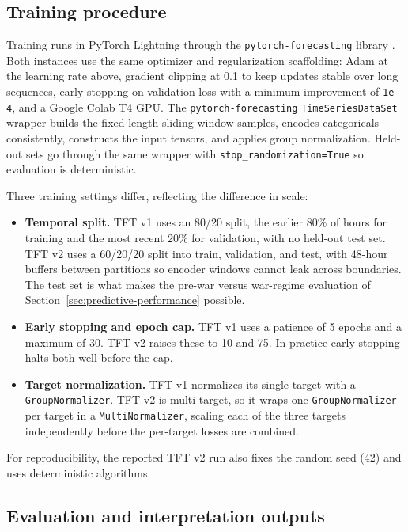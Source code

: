 \subsection{Training procedure}\label{sec:training}

Training runs in PyTorch Lightning \citep{pytorch_lightning} through the \texttt{pytorch-forecasting} library \citep{pytorch_forecasting}. Both instances use the same optimizer and regularization scaffolding: Adam at the learning rate above, gradient clipping at 0.1 to keep updates stable over long sequences, early stopping on validation loss with a minimum improvement of \texttt{1e-4}, and a Google Colab T4 GPU. The \texttt{pytorch-forecasting} \texttt{TimeSeriesDataSet} wrapper builds the fixed-length sliding-window samples, encodes categoricals consistently, constructs the input tensors, and applies group normalization. Held-out sets go through the same wrapper with \texttt{stop\_randomization=True} so evaluation is deterministic.

Three training settings differ, reflecting the difference in scale:

\begin{itemize}
  \item \textbf{Temporal split.} TFT v1 uses an 80/20 split, the earlier 80\% of hours for training and the most recent 20\% for validation, with no held-out test set. TFT v2 uses a 60/20/20 split into train, validation, and test, with 48-hour buffers between partitions so encoder windows cannot leak across boundaries. The test set is what makes the pre-war versus war-regime evaluation of Section~\ref{sec:predictive-performance} possible.
  \item \textbf{Early stopping and epoch cap.} TFT v1 uses a patience of 5 epochs and a maximum of 30. TFT v2 raises these to 10 and 75. In practice early stopping halts both well before the cap.
  \item \textbf{Target normalization.} TFT v1 normalizes its single target with a \texttt{GroupNormalizer}. TFT v2 is multi-target, so it wraps one \texttt{GroupNormalizer} per target in a \texttt{MultiNormalizer}, scaling each of the three targets independently before the per-target losses are combined.
\end{itemize}

For reproducibility, the reported TFT v2 run also fixes the random seed (42) and uses deterministic algorithms.

\subsection{Evaluation and interpretation outputs}\label{sec:evaluation-methods}


